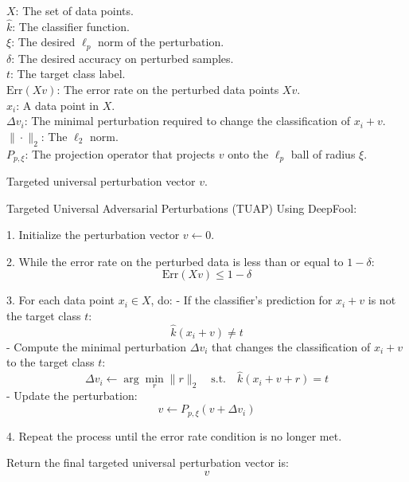 $ X $: The set of data points. \\
$ \hat{k} $: The classifier function. \\
$ \xi $: The desired $\ell_p$ norm of the perturbation. \\
$ \delta $: The desired accuracy on perturbed samples. \\
$ t $: The target class label. \\
$ \text{Err}(Xv) $: The error rate on the perturbed data points $ Xv $. \\
$ x_i $: A data point in $ X $. \\
$ \Delta v_i $: The minimal perturbation required to change the classification of $ x_i + v $. \\
$ \| \cdot \|_2 $: The $\ell_2$ norm. \\
$ P_{p, \xi} $: The projection operator that projects $ v $ onto the $\ell_p$ ball of radius $ \xi $.

Targeted universal perturbation vector $ v $.

Targeted Universal Adversarial Perturbations (TUAP) Using DeepFool:

1. Initialize the perturbation vector $v \leftarrow 0$.

2. While the error rate on the perturbed data is less than or equal to $1 - \delta$:
\[
\text{Err}(Xv) \leq 1 - \delta
\]

3. For each data point $x_i \in X$, do:
    - If the classifier's prediction for $x_i + v$ is not the target class $t$:
    \[
    \hat{k}(x_i + v) \neq t
    \]
        - Compute the minimal perturbation $\Delta v_i$ that changes the classification of $x_i + v$ to the target class $t$:
        \[
        \Delta v_i \leftarrow \arg \min_{r} \|r\|_2 \quad \text{s.t.} \quad \hat{k}(x_i + v + r) = t
        \]
        - Update the perturbation:
        \[
        v \leftarrow P_{p, \xi}(v + \Delta v_i)
        \]

4. Repeat the process until the error rate condition is no longer met.

Return the final targeted universal perturbation vector is:
\[
v
\]

